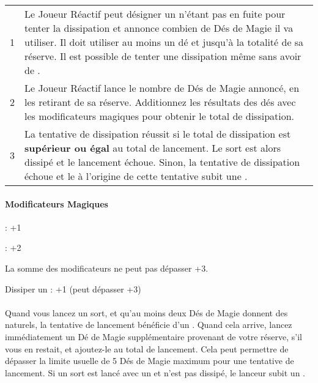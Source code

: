 {\begin{multicols}{2}
\begin{tabular}{c|m{7.35cm}}
1 & Le Joueur Réactif peut désigner un \wizard{} n'étant pas en fuite pour tenter la dissipation et annonce combien de Dés de Magie il va utiliser. Il doit utiliser au moins un dé et jusqu'à la totalité de sa réserve. Il est possible de tenter une dissipation même sans avoir de \wizard{}. \tabularnewline
2 & Le Joueur Réactif lance le nombre de Dés de Magie annoncé, en les retirant de sa réserve. Additionnez les résultats des dés avec les modificateurs magiques pour obtenir le total de dissipation. \tabularnewline
3 & La tentative de dissipation réussit si le total de dissipation est \textbf{supérieur ou égal} au total de lancement. Le sort est alors dissipé et le lancement échoue. Sinon, la tentative de dissipation échoue et le \wizard{} à l'origine de cette tentative subit une \lostfocus{}. \tabularnewline
\end{tabular}

\vspace*{20pt}

\begin{framed}
\vspace*{-17pt}
\paragraph{Modificateurs Magiques}

\noindent \wizardapprentice{} : +1

\vspace*{3pt}
\noindent \wizardmaster{} : +2

\vspace*{3pt}
\noindent La somme des modificateurs ne peut pas dépasser +3.

\vspace*{3pt}
\noindent Dissiper un \boundspell{} : +1 (peut dépasser +3)

\end{framed}

\vspace*{\fill}
\columnbreak

\begin{framed}
\vspace*{-17pt}
\paragraph{\overwhelmingpower}

Quand vous lancez un sort, et qu'au moins deux Dés  de Magie donnent des  naturels, la tentative de lancement bénéficie d'un \overwhelmingpower{}. Quand cela arrive, lancez immédiatement un Dé de Magie supplémentaire provenant de votre réserve, s'il vous en restait, et ajoutez-le au total de lancement. Cela peut permettre de dépasser la limite usuelle de 5 Dés de Magie maximum pour une tentative de lancement. Si un sort est lancé avec un \overwhelmingpower{} et n'est pas dissipé, le lanceur subit un \miscast{}.


\end{framed}
\end{multicols}}
